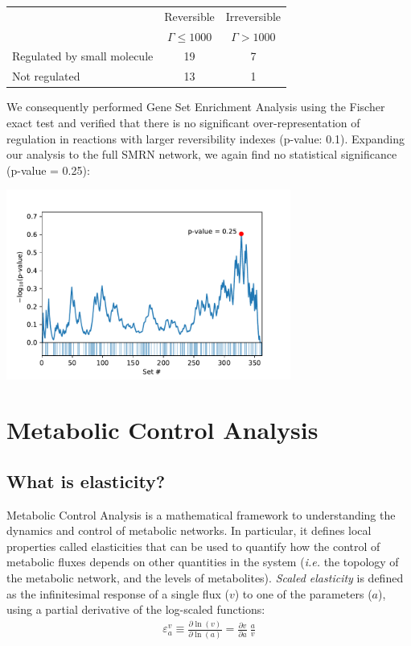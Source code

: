 \documentclass[12pt,a4paper]{article}
\begin{document}
\begin{center}
	\begin{tabular}{|l|c|c|}
		\hline
		& Reversible & Irreversible \\
		& $\Gamma \leq 1000$ & $\Gamma > 1000$ \\ \hline
		Regulated by small molecule & 19 & 7  \\ \hline
		Not regulated & 13 & 1 \\ \hline
	\end{tabular}
\end{center}
We consequently performed Gene Set Enrichment Analysis using the Fischer exact test and verified that there is no significant over-representation of regulation in reactions with larger reversibility indexes (p-value: 0.1). Expanding our analysis to the full SMRN network, we again find no statistical significance (p-value = 0.25):
\begin{center}
\includegraphics[width=0.7\textwidth]{../manuscript/figS10.pdf}
\end{center}

\section{Metabolic Control Analysis}
\subsection{What is elasticity?}
Metabolic Control Analysis \cite{Fell1996-be} is a mathematical framework to understanding the dynamics and control of metabolic networks. In particular, it defines local properties called elasticities that can be used to quantify how the control of metabolic fluxes depends on other quantities in the system (\textit{i.e.} the topology of the metabolic network, and the levels of metabolites). \emph{Scaled elasticity} is defined as the infinitesimal response of a single flux ($v$) to one of the parameters ($a$), using a partial derivative of the log-scaled functions:
\begin{eqnarray}
    \varepsilon_a^v \equiv \frac{\partial \ln(v)}{\partial \ln(a)} = \frac{\partial v}{\partial a} ~ \frac{a}{v}
\end{eqnarray}
\end{document}
